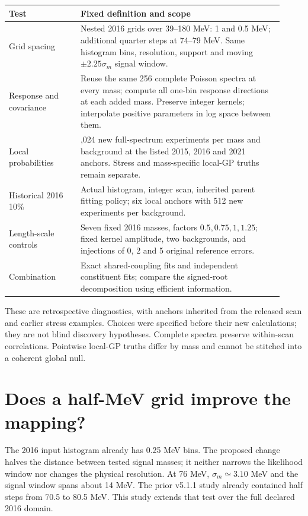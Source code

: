 \documentclass[11pt]{article}
\newcommand{\pageheading}[1]{\section*{\color{navy}#1}}
\begin{document}
\begin{center}\small
\begin{tabular}{>{\raggedright\arraybackslash}p{0.24\linewidth}>{\raggedright\arraybackslash}p{0.68\linewidth}}\toprule
Test & Fixed definition and scope\\\midrule
Grid spacing & Nested 2016 grids over 39--180 MeV: 1 and 0.5 MeV; additional quarter steps at 74--79 MeV. Same histogram bins, resolution, support and moving $\pm2.25\sigma_m$ signal window.\\
Response and covariance & Reuse the same 256 complete Poisson spectra at every mass; compute all one-bin response directions at each added mass. Preserve integer kernels; interpolate positive parameters in log space between them.\\
Local probabilities & 1,024 new full-spectrum experiments per mass and background at the listed 2015, 2016 and 2021 anchors. Stress and mass-specific local-GP truths remain separate.\\
Historical 2016 10\% & Actual histogram, integer scan, inherited parent fitting policy; six local anchors with 512 new experiments per background.\\
Length-scale controls & Seven fixed 2016 masses, factors $0.5,0.75,1,1.25$; fixed kernel amplitude, two backgrounds, and injections of 0, 2 and 5 original reference errors.\\
Combination & Exact shared-coupling fits and independent constituent fits; compare the signed-root decomposition using efficient information.\\\bottomrule
\end{tabular}\end{center}

These are retrospective diagnostics, with anchors inherited from the released scan and earlier stress examples. Choices were specified before their new calculations; they are not blind discovery hypotheses. Complete spectra preserve within-scan correlations. Pointwise local-GP truths differ by mass and cannot be stitched into a coherent global null.

\clearpage
\pageheading{Does a half-MeV grid improve the mapping?}
The 2016 input histogram already has 0.25 MeV bins. The proposed change halves the distance between tested signal masses; it neither narrows the likelihood window nor changes the physical resolution. At 76 MeV, $\sigma_m\simeq3.10$ MeV and the signal window spans about 14 MeV. The prior v5.1.1 study already contained half steps from 70.5 to 80.5 MeV. This study extends that test over the full declared 2016 domain.
\end{document}
